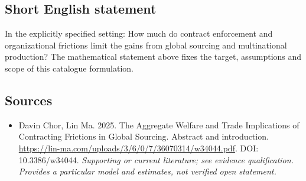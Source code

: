 \documentclass[11pt]{article}
\begin{document}
\subsection{Short English statement}
In the explicitly specified setting: How much do contract enforcement and organizational frictions limit the gains from global sourcing and multinational production? The mathematical statement above fixes the target, assumptions and scope of this catalogue formulation.

\subsection{Sources}
\begin{itemize}\raggedright
\item[\textnormal{[S1]}]\hypertarget{source:30007631:1}{} Davin Chor, Lin Ma. 2025. The Aggregate Welfare and Trade Implications of Contracting Frictions in Global Sourcing. Abstract and introduction.
\url{https://lin-ma.com/uploads/3/6/0/7/36070314/w34044.pdf}.
DOI: 10.3386/w34044.
{\small\textit{Supporting or current literature; see evidence qualification. Provides a particular model and estimates, not verified open statement.}}
\end{itemize}
\end{document}
